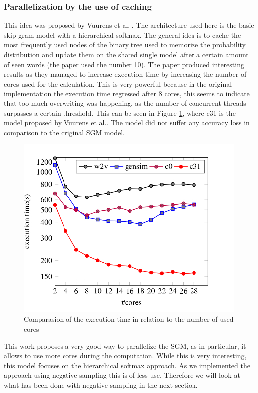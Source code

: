 \subsubsection{Parallelization by the use of caching}
This idea was proposed by Vuurens et al. \cite{efficient}. The architecture used here is the basic skip gram model with a hierarchical softmax.  The general idea is to cache the most frequently used nodes of the binary tree used to memorize the probability distribution and update them on the shared single model after a certain amount of seen words (the paper used the number 10). The paper produced interesting results as they managed to increase execution time by increasing the number of cores used for the calculation. This is very powerful because in the original implementation the execution time regressed after 8 cores, this seems to indicate that too much overwriting was happening, as the number of concurrent threads surpasses a certain threshold. This can be seen in Figure \ref{fig:efficient}, where c31 is the model proposed by Vuurens et al.\cite{efficient}. The model did not suffer any accuracy loss in comparison to the original SGM model. 
\begin{figure}[ht]
    \centering
            \includegraphics[scale=0.3]{images/cachingEfficiency.png} 
    \caption{Comparasion of the execution time in relation to the number of used cores \cite{efficient}}
    \label{fig:efficient}
\end{figure}
This work proposes a very good way to parallelize the SGM, as in particular, it allows to use more cores during the computation. While this is very interesting, this model focuses on the hierarchical softmax approach. As we implemented the approach using negative sampling this is of less use. Therefore we will look at what has been done with negative sampling in the next section.

